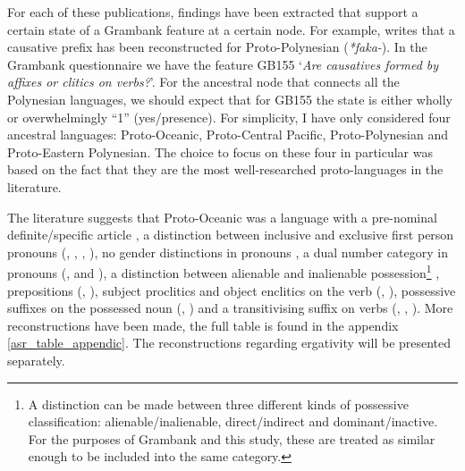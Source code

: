 \documentclass[a4paper,10pt]{article} %
\begin{document}
For each of these publications, findings have been extracted that support a certain state of a Grambank feature at a certain node. For example, \citet[4]{marck2000_encyclo} writes that a causative prefix has been reconstructed for Proto-Polynesian (\emph{*faka-}). In the Grambank questionnaire we have the feature GB155 `\emph{Are causatives formed by affixes or clitics on verbs?}'. For the ancestral node that connects all the Polynesian languages, we should expect that for GB155 the state is either wholly or overwhelmingly ``1'' (yes/presence). For simplicity, I have only considered four ancestral languages: Proto-Oceanic, Proto-Central Pacific, Proto-Polynesian and Proto-Eastern Polynesian. The choice to focus on these four in particular was based on the fact that they are the most well-researched proto-languages in the literature. 


The literature suggests that Proto-Oceanic was a language with a pre-nominal definite/specific article \citep[136]{crowley1985common}, a distinction between inclusive and exclusive first person pronouns (\citet[112]{pawley1973some}, \citet[184]{crowley1985common}, \citet[500]{ross2004morphosyntactic}, \citet[67, 75]{lynchrosscrowley_proto_grammar_oceanic}), no gender distinctions in pronouns \citep[498]{ross2004morphosyntactic}, a dual number category in pronouns (\citet[498]{ross2004morphosyntactic}, \citet[69]{lynchrosscrowley_proto_grammar_oceanic} and \citet[173]{pawley1973some}), a distinction between alienable and inalienable possession\footnote{A distinction can be made between three different kinds of possessive classification: alienable/inalienable, direct/indirect and dominant/inactive. For the purposes of Grambank and this study, these are treated as similar enough to be included into the same category.} \citep[69]{lynchrosscrowley_proto_grammar_oceanic}, prepositions (\citet[167]{pawley1973some}, \citet[498]{ross2004morphosyntactic}), subject proclitics and object enclitics on the verb (\citet[498-499]{ross2004morphosyntactic}, \citet[83]{lynchrosscrowley_proto_grammar_oceanic}), possessive suffixes on the possessed noun (\citet[495]{ross2004morphosyntactic}, \citet[155]{pawley1973some}) and a transitivising suffix on verbs (\citet[352]{pawley1970change}, \citet[171]{pawley1973some}, \citet[80, 92]{lynchrosscrowley_proto_grammar_oceanic}). More reconstructions have been made, the full table is found in the appendix \ref{asr_table_appendic}. The reconstructions regarding ergativity will be presented separately.
\end{document}
